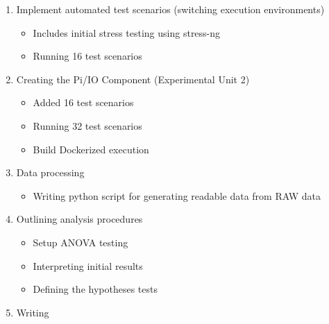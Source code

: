 \begin{enumerate}[label=\protect\circled{\arabic*}]
\begin{itemize}
	\end{itemize}
\item Implement automated test scenarios (switching execution environments)
	\begin{itemize}
		\item{Includes initial stress testing using stress-ng}
		\item{Running 16 test scenarios}
	\end{itemize}
\item Creating the Pi/IO Component (Experimental Unit 2)
	\begin{itemize}
		\item{Added 16 test scenarios}
		\item{Running 32 test scenarios}
		\item{Build Dockerized execution}
	\end{itemize}
\item Data processing
	\begin{itemize}
		\item{Writing python script for generating readable data from RAW data}
	\end{itemize}
\item Outlining analysis procedures
	\begin{itemize}
		\item{Setup ANOVA testing}
		\item{Interpreting initial results}
		\item{Defining the hypotheses tests}
	\end{itemize}
\item Writing
\end{enumerate}

